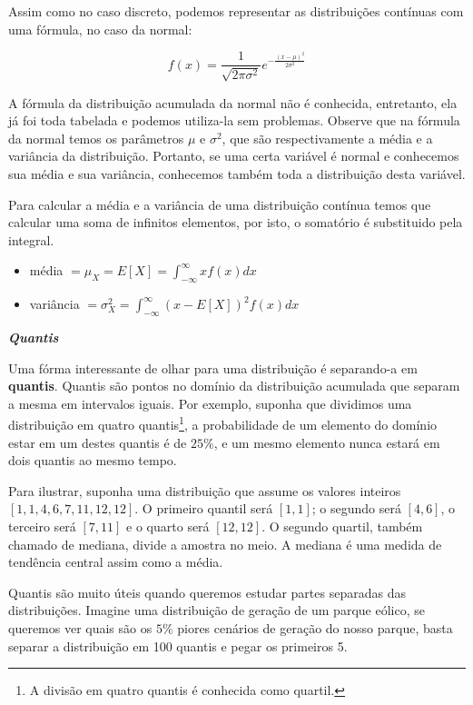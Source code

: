 Assim como no caso discreto, podemos representar as distribuições contínuas com uma fórmula, no caso da normal:

\begin{equation}
f(x)=\frac{1}{\sqrt{2 \pi \sigma^2}} e^{-\frac{(x-\mu)^2}{2\sigma^2}}
\end{equation}

A fórmula da distribuição acumulada da normal não é conhecida, entretanto, ela já foi toda tabelada e podemos utiliza-la sem problemas. Observe que na fórmula da normal temos os parâmetros $\mu$ e $\sigma^2$, que são respectivamente a média e a variância da distribuição. Portanto, se uma certa variável é normal e conhecemos sua média e sua variância, conhecemos também toda a distribuição desta variável.

Para calcular a média e a variância de uma distribuição contínua temos que calcular uma soma de infinitos elementos, por isto, o somatório é substituido pela integral.

\begin{itemize}
\item média $=\mu_X =E[X]=\int_{-\infty}^{\infty} xf(x)dx$
\item variância $=\sigma^2_X=\int_{-\infty}^{\infty} (x-E[X])^2 f(x)dx$  \end{itemize}

\textbf{\textit{Quantis}}

Uma fórma interessante de olhar para uma distribuição é separando-a em \textbf{quantis}. Quantis são pontos no domínio da distribuição acumulada que separam a mesma em intervalos iguais. Por exemplo, suponha que dividimos uma distribuição em quatro quantis\footnote{A divisão em quatro quantis é conhecida como quartil.}, a probabilidade de um elemento do domínio estar em um destes quantis é de $25\%$, e um mesmo elemento nunca estará em dois quantis ao mesmo tempo. 

Para ilustrar, suponha uma distribuição que assume os valores inteiros $[1,1,4,6,7,11,12,12]$. O primeiro quantil será $[1,1]$; o segundo será $[4,6]$, o terceiro será $[7,11]$ e o quarto será $[12,12]$. O segundo quartil, também chamado de mediana, divide a amostra no meio. A mediana é uma medida de tendência central assim como a média.

Quantis são muito úteis quando queremos estudar partes separadas das distribuições. Imagine uma distribuição de geração de um parque eólico, se queremos ver quais são os $5\%$ piores cenários de geração do nosso parque, basta separar a distribuição em 100 quantis e pegar os primeiros 5.
